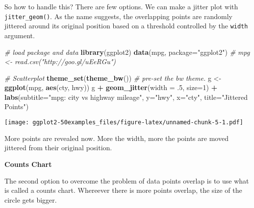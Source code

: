 \documentclass[a4paper]{article}
\newenvironment{Shaded}{\begin{snugshade}}{\end{snugshade}}
\newcommand{\KeywordTok}[1]{\textcolor[rgb]{0.13,0.29,0.53}{\textbf{#1}}}
\newcommand{\DataTypeTok}[1]{\textcolor[rgb]{0.13,0.29,0.53}{#1}}
\newcommand{\DecValTok}[1]{\textcolor[rgb]{0.00,0.00,0.81}{#1}}
\newcommand{\StringTok}[1]{\textcolor[rgb]{0.31,0.60,0.02}{#1}}
\newcommand{\CommentTok}[1]{\textcolor[rgb]{0.56,0.35,0.01}{\textit{#1}}}
\newcommand{\OperatorTok}[1]{\textcolor[rgb]{0.81,0.36,0.00}{\textbf{#1}}}
\newcommand{\NormalTok}[1]{#1}
\begin{document}
So how to handle this? There are few options. We can make a jitter plot
with \texttt{jitter\_geom()}. As the name suggests, the overlapping
points are randomly jittered around its original position based on a
threshold controlled by the \texttt{width} argument.

\begin{Shaded}
\begin{Highlighting}[]
\CommentTok{# load package and data}
\KeywordTok{library}\NormalTok{(ggplot2)}
\KeywordTok{data}\NormalTok{(mpg, }\DataTypeTok{package=}\StringTok{"ggplot2"}\NormalTok{)}
\CommentTok{# mpg <- read.csv("http://goo.gl/uEeRGu")}

\CommentTok{# Scatterplot}
\KeywordTok{theme_set}\NormalTok{(}\KeywordTok{theme_bw}\NormalTok{())  }\CommentTok{# pre-set the bw theme.}
\NormalTok{g <-}\StringTok{ }\KeywordTok{ggplot}\NormalTok{(mpg, }\KeywordTok{aes}\NormalTok{(cty, hwy))}
\NormalTok{g }\OperatorTok{+}\StringTok{ }\KeywordTok{geom_jitter}\NormalTok{(}\DataTypeTok{width =}\NormalTok{ .}\DecValTok{5}\NormalTok{, }\DataTypeTok{size=}\DecValTok{1}\NormalTok{) }\OperatorTok{+}
\StringTok{  }\KeywordTok{labs}\NormalTok{(}\DataTypeTok{subtitle=}\StringTok{"mpg: city vs highway mileage"}\NormalTok{, }
       \DataTypeTok{y=}\StringTok{"hwy"}\NormalTok{, }
       \DataTypeTok{x=}\StringTok{"cty"}\NormalTok{, }
       \DataTypeTok{title=}\StringTok{"Jittered Points"}\NormalTok{)}
\end{Highlighting}
\end{Shaded}

\texttt{[image: ggplot2-50examples\_files/figure-latex/unnamed-chunk-5-1.pdf]}

More points are revealed now. More the width, more the points are moved
jittered from their original position.

\newpage

\textbf{Counts Chart}

The second option to overcome the problem of data points overlap is to
use what is called a counts chart. Whereever there is more points
overlap, the size of the circle gets bigger.
\end{document}
